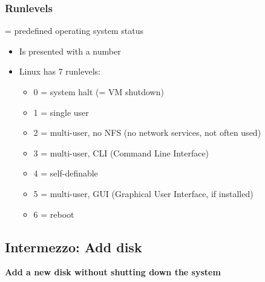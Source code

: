 \documentclass{article}
\begin{document}
\subsubsection{Runlevels}

= predefined operating system status

\begin{itemize}
    \item Is presented with a number
    \item Linux has 7 runlevels:
    \begin{itemize}
        \item 0 = system halt (= VM shutdown)
        \item 1 = single user
        \item 2 = multi-user, no NFS (no network services, not often used)
        \item 3 = multi-user, CLI (Command Line Interface)
        \item 4 = self-definable
        \item 5 = multi-user, GUI (Graphical User Interface, if installed)
        \item 6 = reboot
    \end{itemize}
\end{itemize}

\subsection{Intermezzo: Add disk}

\textbf{Add a new disk without shutting down the system}
\end{document}
